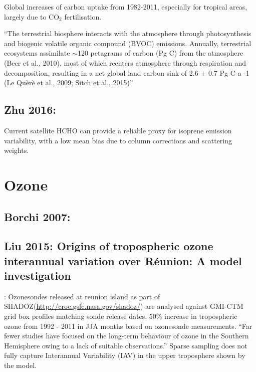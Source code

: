 \documentclass[11pt]{article} %
\begin{document}
    Global increases of carbon uptake from 1982-2011, especially for tropical areas, largely due to CO$_2$ fertilisation.
    
    ``The terrestrial biosphere interacts with the atmosphere through photosynthesis and biogenic volatile organic compound (BVOC) emissions. Annually, terrestrial ecosystems assimilate $\sim$120 petagrams of carbon (Pg C) from the atmosphere (Beer et al., 2010), most of which reenters atmosphere through respiration and decomposition, resulting in a net global land carbon sink of 2.6 $\pm$ 0.7 Pg C a -1 (Le Quèrè et al., 2009; Sitch et al., 2015)''
    
  \subsection{Zhu 2016: }
    \citet{Zhu2016}
    Current satellite HCHO can provide a reliable proxy for isoprene emission variability, with a low mean bias due to column corrections and scattering weights.
    


\section{Ozone}
  \subsection{Borchi 2007:}


  \subsection{Liu 2015: Origins of tropospheric ozone interannual variation over Réunion: A model investigation}
    \citet{Liu2015}:
    Ozonesondes released at reunion island as part of SHADOZ(\url{http://croc.gsfc.nasa.gov/shadoz/}) are analysed against GMI-CTM grid box profiles matching sonde release dates.
    50\% increase in tropospheric ozone from 1992 - 2011 in JJA months based on ozonesonde measurements.
    ``Far fewer studies have focused on the long-term behaviour of ozone in the Southern Hemisphere owing to a lack of suitable observations.''
    Sparse sampling does not fully capture Interannual Variability (IAV) in the upper troposphere shown by the model.
    
\end{document}
